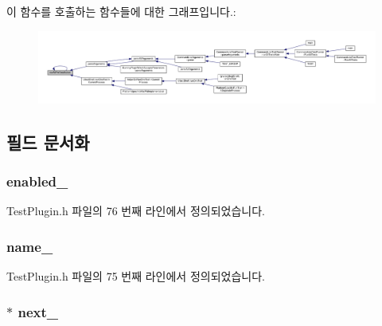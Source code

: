 이 함수를 호출하는 함수들에 대한 그래프입니다.\+:
\nopagebreak
\begin{figure}[H]
\begin{center}
\leavevmode
\includegraphics[width=350pt]{class_test_plugin_aa3524b10b0f1613104fa75f1c1a72cf6_icgraph}
\end{center}
\end{figure}




\subsection{필드 문서화}
\subsubsection[{\texorpdfstring{enabled\+\_\+}{enabled_}}]{ enabled\+\_\+\hspace{0.3cm}{\ttfamily [private]}}\hypertarget{class_test_plugin_ab6dfcb3e6c79f4def1295fea7f0de8c0}{}\label{class_test_plugin_ab6dfcb3e6c79f4def1295fea7f0de8c0}


Test\+Plugin.\+h 파일의 76 번째 라인에서 정의되었습니다.

\subsubsection[{\texorpdfstring{name\+\_\+}{name_}}]{ name\+\_\+\hspace{0.3cm}{\ttfamily [private]}}\hypertarget{class_test_plugin_aac73c86e1e892f392d1fc423e25f51a8}{}\label{class_test_plugin_aac73c86e1e892f392d1fc423e25f51a8}


Test\+Plugin.\+h 파일의 75 번째 라인에서 정의되었습니다.

\subsubsection[{\texorpdfstring{next\+\_\+}{next_}}]{$\ast$ next\+\_\+\hspace{0.3cm}{\ttfamily [private]}}\hypertarget{class_test_plugin_a9461650e936ee3765377081fb8bc15dc}{}\label{class_test_plugin_a9461650e936ee3765377081fb8bc15dc}


